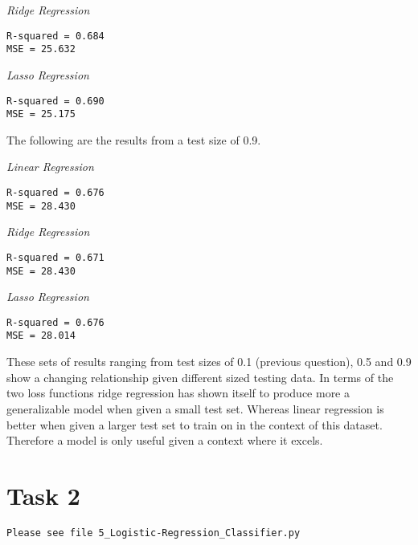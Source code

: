 \documentclass[11pt]{diazessay} %
\begin{document}
\textit{Ridge Regression }
\begin{lstlisting}
R-squared = 0.684
MSE = 25.632
\end{lstlisting}

\textit{Lasso Regression }
\begin{lstlisting}
R-squared = 0.690
MSE = 25.175
\end{lstlisting}


The following are the results from a test size of 0.9. 

\textit{Linear Regression }
\begin{lstlisting}
R-squared = 0.676
MSE = 28.430
\end{lstlisting}


\textit{Ridge Regression }
\begin{lstlisting}
R-squared = 0.671
MSE = 28.430
\end{lstlisting}

\textit{Lasso Regression }
\begin{lstlisting}
R-squared = 0.676
MSE = 28.014
\end{lstlisting}

These sets of results ranging from test sizes of 0.1 (previous question), 0.5 and 0.9 show a changing relationship given different sized testing data. In terms of the two loss functions ridge regression has shown itself to produce more a generalizable model when given a small test set. Whereas linear regression is better when given a larger test set to train on in the context of this dataset. Therefore a model is only useful given a context where it excels.

\clearpage
\section*{Task 2}

\begin{lstlisting}
Please see file 5_Logistic-Regression_Classifier.py
\end{lstlisting}






\clearpage
%


%

\end{document}
